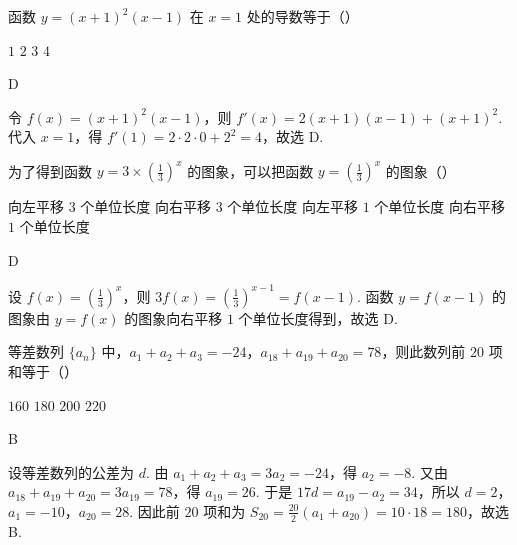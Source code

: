 \begin{problem}
函数 \( y = (x + 1)^2 (x - 1) \) 在 \( x = 1 \) 处的导数等于（\quad）

\choices
    {\(1\)}
    {\(2\)}
    {\(3\)}
    {\(4\)}
\end{problem}

\begin{answer}
D
\end{answer}

\begin{solution}
令 \(f(x)=(x+1)^2(x-1)\)，则 \(f'(x)=2(x+1)(x-1)+(x+1)^2\). 代入 \(x=1\)，得 \(f'(1)=2\cdot2\cdot0+2^2=4\)，故选 D.
\end{solution}

\begin{problem}
为了得到函数 \( y = 3 \times \left(\frac{1}{3}\right)^x \) 的图象，可以把函数 \( y = \left(\frac{1}{3}\right)^x \) 的图象（\quad）

\choices
    {向左平移 \(3\) 个单位长度}
    {向右平移 \(3\) 个单位长度}
    {向左平移 \(1\) 个单位长度}
    {向右平移 \(1\) 个单位长度}
\end{problem}

\begin{answer}
D
\end{answer}

\begin{solution}
设 \(f(x)=\left(\frac{1}{3}\right)^x\)，则 \(3f(x)=\left(\frac{1}{3}\right)^{x-1}=f(x-1)\). 函数 \(y=f(x-1)\) 的图象由 \(y=f(x)\) 的图象向右平移 \(1\) 个单位长度得到，故选 D.
\end{solution}

\begin{problem}
等差数列 \(\{a_{n}\}\) 中，\(a_{1} + a_{2} + a_{3} = -24\)，\(a_{18} + a_{19} + a_{20} = 78\)，则此数列前 \(20\) 项和等于（\quad）

\choices
    {\(160\)}
    {\(180\)}
    {\(200\)}
    {\(220\)}
\end{problem}

\begin{answer}
B
\end{answer}

\begin{solution}
设等差数列的公差为 \(d\). 由 \(a_1+a_2+a_3=3a_2=-24\)，得 \(a_2=-8\). 又由 \(a_{18}+a_{19}+a_{20}=3a_{19}=78\)，得 \(a_{19}=26\). 于是 \(17d=a_{19}-a_2=34\)，所以 \(d=2\)，\(a_1=-10\)，\(a_{20}=28\). 因此前 \(20\) 项和为 \(S_{20}=\frac{20}{2}(a_1+a_{20})=10\cdot18=180\)，故选 B.
\end{solution}

